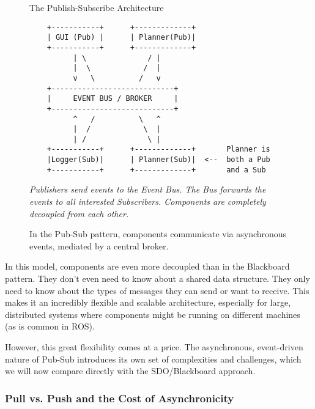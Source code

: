 \newpage
\begin{figure}[h!]
    \centering
    \begin{infobox}{The Publish-Subscribe Architecture} %
        \begin{verbatim}
    +-----------+      +-------------+
    | GUI (Pub) |      | Planner(Pub)|
    +-----------+      +-------------+
          | \              / |
          |  \            /  |
          v   \          /   v
    +----------------------------+
    |     EVENT BUS / BROKER     |
    +----------------------------+
          ^   /          \   ^
          |  /            \  |
          | /              \ |
    +-----------+      +-------------+       Planner is
    |Logger(Sub)|      | Planner(Sub)|  <--  both a Pub 
    +-----------+      +-------------+       and a Sub
        \end{verbatim}
        
        \textit{Publishers send events to the Event Bus. The Bus forwards the events to all interested Subscribers. Components are completely decoupled from each other.}
    \end{infobox}
    \caption{In the Pub-Sub pattern, components communicate via asynchronous events, mediated by a central broker.}
    \label{fig:pub_sub_architecture}
\end{figure}

In this model, components are even more decoupled than in the Blackboard pattern. They don't even need to know about a shared data structure. They only need to know about the types of messages they can send or want to receive. This makes it an incredibly flexible and scalable architecture, especially for large, distributed systems where components might be running on different machines (as is common in ROS).

However, this great flexibility comes at a price. The asynchronous, event-driven nature of Pub-Sub introduces its own set of complexities and challenges, which we will now compare directly with the SDO/Blackboard approach.




\subsubsection{Pull vs. Push and the Cost of Asynchronicity}
\label{subsubsec:pull_vs_push}

